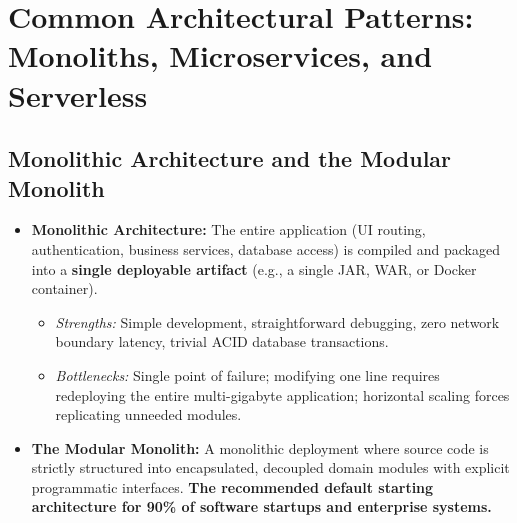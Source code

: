 \section{Common Architectural Patterns: Monoliths, Microservices, and Serverless}
\label{sec:se_architectural_patterns}

\subsection{Monolithic Architecture and the Modular Monolith}
\begin{itemize}
    \item \textbf{Monolithic Architecture:} The entire application (UI routing, authentication, business services, database access) is compiled and packaged into a \textbf{single deployable artifact} (e.g., a single JAR, WAR, or Docker container).
    \begin{itemize}
        \item \textit{Strengths:} Simple development, straightforward debugging, zero network boundary latency, trivial ACID database transactions.
        \item \textit{Bottlenecks:} Single point of failure; modifying one line requires redeploying the entire multi-gigabyte application; horizontal scaling forces replicating unneeded modules.
    \end{itemize}
    \item \textbf{The Modular Monolith:} A monolithic deployment where source code is strictly structured into encapsulated, decoupled domain modules with explicit programmatic interfaces. \textbf{The recommended default starting architecture for 90\% of software startups and enterprise systems.}
\end{itemize}

